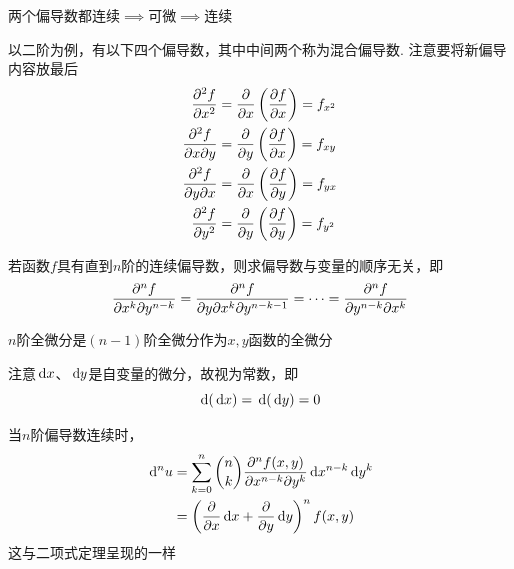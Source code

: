 \begin{theorem}
两个偏导数都连续$\implies$可微$\implies$连续
\end{theorem}
\begin{definition}[高阶偏导数]
以二阶为例，有以下四个偏导数，其中中间两个称为混合偏导数. 注意要将新偏导内容放最后
\[\begin{aligned}
\pdd{f}{x}&=\pd{}{x}\lrp{\pd{f}{x}}=f_{x^2}\\
\pddxy{f}{x}{y}&=\pd{}{y}\lrp{\pd{f}{x}}=f_{xy}\\
\pddxy{f}{y}{x}&=\pd{}{x}\lrp{\pd{f}{y}}=f_{yx}\\
\pdd{f}{y}&=\pd{}{y}\lrp{\pd{f}{y}}=f_{y^2}
\end{aligned}\]
\end{definition}
\begin{theorem}[混合偏导数相等]
若函数$f$具有直到$n$阶的连续偏导数，则求偏导数与变量的顺序无关，即
\[\pddd{n}{f}{x^k}{y^{n-k}}=\dfrac{\partial^n f}{\partial y\partial x^k\partial y^{n-k-1}}=\cdots=\pddd{n}{f}{y^{n-k}}{x^{k}}\]
\end{theorem}
$n$阶全微分是$(n-1)$阶全微分作为$x,y$函数的全微分
\par 注意$\diff x$、$\diff y$是自变量的微分，故视为常数，即
\[\diff(\diff x)=\diff(\diff y)=0\]
\begin{theorem}[高阶全微分]
当$n$阶偏导数连续时，
\[\begin{aligned}
\diff^n u&=\sum_{k=0}^n\binom{n}{k}\pddd{n}{f(x,y)}{x^{n-k}}{y^k}\diff x^{n-k}\diff y^k\\
&=\lrp{\pd{}{x}\diff x+\pd{}{y}\diff y}^n f(x,y)
\end{aligned}\]
这与二项式定理呈现的一样
\end{theorem}

